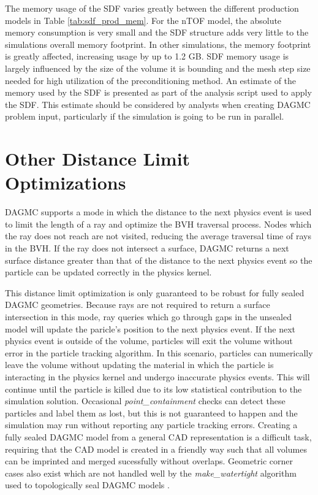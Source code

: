 The memory usage of the SDF varies greatly between the different production
models in Table \ref{tab:sdf_prod_mem}. For the nTOF model, the absolute memory
consumption is very small and the SDF structure adds very little to the
simulations overall memory footprint. In other simulations, the memory
footprint is greatly affected, increasing usage by up to 1.2 GB. SDF memory
usage is largely influenced by the size of the volume it is bounding and the
mesh step size needed for high utilization of the preconditioning method. An
estimate of the memory used by the SDF is presented as part of the analysis
script used to apply the SDF. This estimate should be considered by analysts
when creating DAGMC problem input, particularly if the simulation is going to be
run in parallel.

\section{Other Distance Limit Optimizations}

DAGMC supports a mode in which the distance to the next physics event is used to
limit the length of a ray and optimize the BVH traversal process. Nodes which
the ray does not reach are not visited, reducing the average traversal time of
rays in the BVH. If the ray does not intersect a surface, DAGMC returns a next
surface distance greater than that of the distance to the next physics event so
the particle can be updated correctly in the physics kernel.

This distance limit optimization is only guaranteed to be robust for fully
sealed DAGMC geometries. Because rays are not required to return a surface
intersection in this mode, ray queries which go through gaps in the unsealed
model will update the paricle's position to the next physics event. If the next
physics event is outside of the volume, particles will exit the volume without
error in the particle tracking algorithm. In this scenario, particles can
numerically leave the volume without updating the material in which the particle
is interacting in the physics kernel and undergo inaccurate physics events. This
will continue until the particle is killed due to its low statistical
contribution to the simulation solution. Occasional \textit{point_containment}
checks can detect these particles and label them as lost, but this is not
guaranteed to happen and the simulation may run without reporting any particle
tracking errors. Creating a fully sealed DAGMC model from a general CAD
representation is a difficult task, requiring that the CAD model is created in a
friendly way such that all volumes can be imprinted and merged sucessfully
without overlaps. Geometric corner cases also exist which are not handled well
by the \textit{make_watertight} algorithm used to topologically seal DAGMC
models \cite{Smith_2011}.

